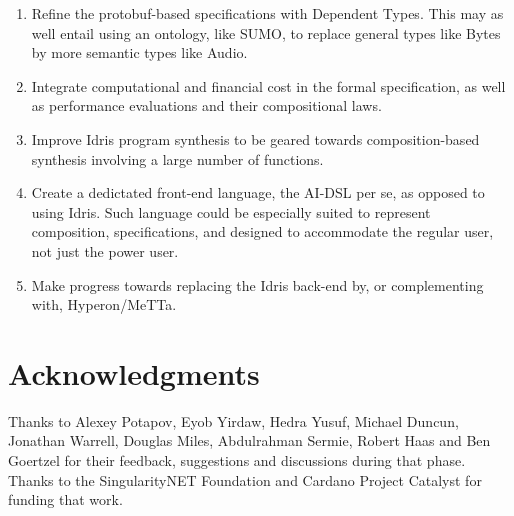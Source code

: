 \documentclass[]{report}
\begin{document}
\begin{enumerate}
\item Refine the protobuf-based specifications with Dependent Types.
  This may as well entail using an ontology, like SUMO, to replace
  general types like Bytes by more semantic types like Audio.
\item Integrate computational and financial cost in the formal
  specification, as well as performance evaluations and their
  compositional laws.
\item Improve Idris program synthesis to be geared towards
  composition-based synthesis involving a large number of functions.
\item Create a dedictated front-end language, the AI-DSL per se, as
  opposed to using Idris.  Such language could be especially suited to
  represent composition, specifications, and designed to accommodate
  the regular user, not just the power user.
\item Make progress towards replacing the Idris back-end by, or
  complementing with, Hyperon/MeTTa.
\end{enumerate}

\section{Acknowledgments}

Thanks to Alexey Potapov, Eyob Yirdaw, Hedra Yusuf, Michael Duncun,
Jonathan Warrell, Douglas Miles, Abdulrahman Sermie, Robert Haas and
Ben Goertzel for their feedback, suggestions and discussions during
that phase.  Thanks to the SingularityNET Foundation and Cardano
Project Catalyst for funding that work.




\end{document}
